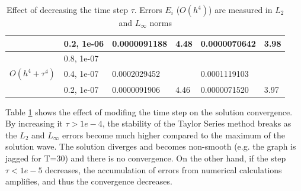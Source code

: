 \documentclass[%
 aip,
cp,  
 amsmath,amssymb,
 reprint,
]{iopconfser}
\begin{document}
\begin{table}[ht]
\begin{tabular}{||c|l|ll|ll||}
                    &0.2, 1e-06  & 0.0000091188 & 4.48  &0.0000070642 &      3.98    \\
    \hline
                    &0.8, 1e-07          &              &              &                     &      \\
       $O(h^4 + \tau^ 4)$                  &0.4, 1e-07          &0.0002029452 &            & 0.0001119103    &       \\
   &0.2, 1e-07  & 0.0000091906 & 4.46  &0.0000071520 &       3.97    \\
    \hline
			\hline 
		\end{tabular}
		\caption{Effect of decreasing the time step $\tau$. Errors $E_i$ ($O(h^{4})$) are measured in $L_2$ and $L_\infty$ norms}
\label{tableConvSeq}
\end{table}
Table \ref{tableConvSeq} shows the effect of modifing the time step on the solution convergence. By increasing it $\tau>1e-4$, the stability of the Taylor Series method breaks as the $L_2$ and $L_\infty$ errors become much higher compared to the maximum of the solution wave. The solution diverges and becomes non-smooth (e.g. the graph is jagged for T=30) and there is no convergence. On the other hand, if the step $\tau<1e-5$ decreases, the accumulation of errors from numerical calculations amplifies, and thus the convergence decreases.
\end{document}
